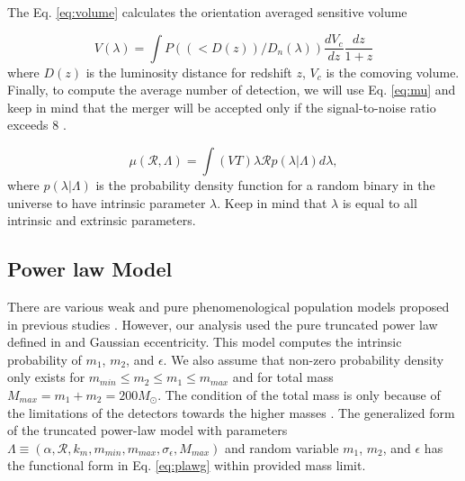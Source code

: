\documentclass[twocolumn,prd,nofootinbib]{revtex4}
\begin{document}
The Eq. \ref{eq:volume} calculates the orientation averaged sensitive volume \cite{Abbott_2016,richard2010volume}

\begin{equation}
\label{eq:volume}
V(\lambda) = \int P((<D(z))/D_n(\lambda))\frac{dV_c}{dz}\frac{dz}{1+z}
\end{equation}    
where $D(z)$ is the luminosity distance for redshift $z$, $V_c$ is the comoving volume. Finally, to compute the average number of detection, we will use Eq. \ref{eq:mu} and keep in mind that the merger will be accepted only if the signal-to-noise ratio exceeds 8 \cite{SNR_2010}.

\begin{equation}
\label{eq:mu}
  \mu(\mathcal{R},\Lambda) = \int(VT)\lambda \mathcal{R}p(\lambda|\Lambda)d\lambda ,
\end{equation}
where $p(\lambda|\Lambda)$ is the probability density function for a random binary in the universe to have intrinsic parameter $\lambda$. Keep in mind that $\lambda$ is equal to all intrinsic and extrinsic parameters.


\subsection{Power law Model}
There are various weak and pure phenomenological population models proposed in previous studies \cite{2016PRXAbbot_BBH_model,2017FishBach_BBH_model,2018talbot_bbh_model}. However, our analysis used the pure truncated power law defined in \cite{2016PRXAbbot_BBH_model,2017FishBach_BBH_model} and Gaussian eccentricity. This model computes the intrinsic probability of $m_1$, $m_2$, and $\epsilon$.  
We also assume that non-zero probability density only exists for $m_{min}\leq m_2 \leq m_1 \leq m_{max}$ and for total mass $M_{max}=m_1+m_2 = 200 M_\odot$. The condition of the total mass is only because of the limitations of the detectors towards the higher masses \cite{2016PRXAbbot_BBH_model}. The generalized form of the truncated power-law model with parameters $\Lambda \equiv  (\alpha, \mathcal{R}, k_m, m_{min}, m_{max}, \sigma_\epsilon, M_{max})$ and random variable $m_1$, $m_2$, and $\epsilon$ has the functional form in Eq. \ref{eq:plawg} within provided mass limit.
\end{document}
